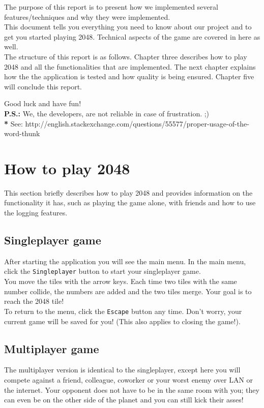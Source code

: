 \documentclass[a4paper,11pt,report]{scrartcl}
\begin{document}
The purpose of this report is to present how we implemented several features/techniques and why they were implemented.\\
This document tells you everything you need to know about our project and to get you started playing 2048. Technical aspects of the game are covered in here as well.\\

 The structure of this report is as follows. Chapter three describes how to play 2048 and all the functionalities that are implemented. The next chapter explains how the the application is tested and how quality is being ensured. Chapter five will conclude this report. 


Good luck and have fun!\\

\textbf{P.S.:} We, the developers, are not reliable in case of frustration. ;)\\

\textbf{*} See: http://english.stackexchange.com/questions/55577/proper-usage-of-the-word-thunk

\newpage\section{How to play 2048}

This section briefly describes how to play 2048 and provides information on
the functionality it has, such as playing the game alone, with friends and how
to use the logging features.

\subsection{Singleplayer game}
After starting the application you will see the main menu. In the main menu,
click the \texttt{Singleplayer} button to start your singleplayer game.\\

You move the tiles with the arrow keys. Each time two tiles with the same
number collide, the numbers are added and the two tiles merge. Your goal is to
reach the 2048 tile!\\

To return to the menu, click the \texttt{Escape} button any time. Don't worry,
your current game will be saved for you! (This also applies to closing the
game!).

\subsection{Multiplayer game}
The multiplayer version is identical to the singleplayer, except here you will
compete against a friend, colleague, coworker or your worst enemy over LAN or
the internet. Your opponent does not have to be in the same room with you; they
can even be on the other side of the planet and you can still kick their
asses!\\
\end{document}
